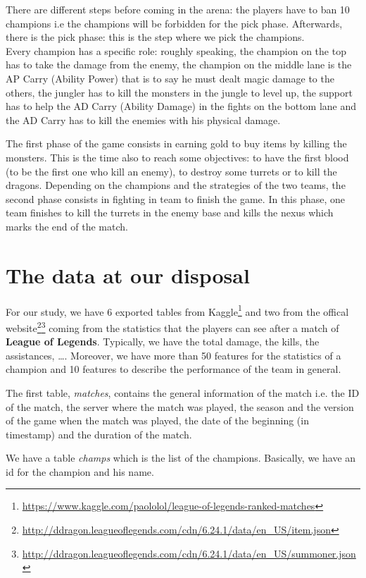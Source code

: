 \documentclass{article}
\def\lol{\textbf{League of Legends}}
\begin{document}
There are different steps before coming in the arena: the players have to ban 10 champions i.e the champions will be forbidden for the pick phase. Afterwards, there is the pick phase: this is the step where we pick the champions.\\ 
Every champion has a specific role: roughly speaking, the champion on the top has to take the damage from the enemy, the champion on the middle lane is the AP Carry (Ability Power) that is to say he must dealt magic damage to the others, the jungler has to kill the monsters in the jungle to level up, the support has to help the AD Carry (Ability Damage) in the fights on the bottom lane and the AD Carry has to kill the enemies with his physical damage. 

The first phase of the game consists in earning gold to buy items by killing the monsters. This is the time also to reach some objectives: to have the first blood (to be the first one who kill an enemy), to destroy some turrets or to kill the dragons. 
Depending on the champions and the strategies of the two teams, the second phase consists in fighting in team to finish the game. In this phase, one team finishes to kill the turrets in the enemy base and kills the nexus which marks the end of the match. 

\section{The data at our disposal}

For our study, we have 6 exported tables from Kaggle\footnote{\url{https://www.kaggle.com/paololol/league-of-legends-ranked-matches}} and two from the offical website\footnote{\url{http://ddragon.leagueoflegends.com/cdn/6.24.1/data/en_US/item.json}}\footnote{ \url{http://ddragon.leagueoflegends.com/cdn/6.24.1/data/en_US/summoner.json}} coming from the statistics that the players can see after a match of \lol. Typically, we have the total damage, the kills, the assistances, \ldots. Moreover, we have more than 50 features for the statistics of a champion and 10 features to describe the performance of the team in general.

The first table, \emph{matches}, contains the general information of the match i.e. the ID of the match, the server where the match was played, the season and the version of the game when the match was played, the date of the beginning (in timestamp) and the duration of the match.

We have a table \emph{champs} which is the list of the champions. Basically, we have an id for the champion and his name. 
\end{document}
